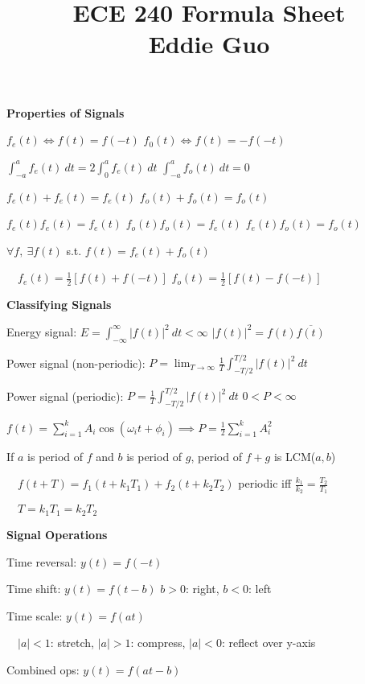 \documentclass[twocolumn]{article}
\title{
	\vspace{-2em}
	\normalsize \textbf{ECE 240 Formula Sheet} \\
	\small Eddie Guo \\
	\dotfill
	\vspace{-5em}
}
\date{}
\begin{document}
\maketitle

\small

\textbf{Properties of Signals}

$f_e(t) \iff f(t) = f(-t)$ \hfill $f_0(t) \iff f(t) = -f(-t)$

$\int_{-a}^a f_e(t)\ dt = 2\int_0^a f_e(t)\ dt$ \hfill $\int_{-a}^a f_o(t)\ dt = 0$

$f_e(t) + f_e(t) = f_e(t)$ \hfill $f_o(t) + f_o(t) = f_o(t)$

$f_e(t) f_e(t) = f_e(t)$ \hfill $f_o(t) f_o(t) = f_e(t)$ \hfill $f_e(t) f_o(t) = f_o(t)$

$\forall f,\ \exists f(t)$ s.t. $f(t) = f_e(t) + f_o(t)$

$\quad f_e(t) = \frac{1}{2} [f(t) + f(-t)]$ \hfill $f_o(t) = \frac{1}{2}[f(t) - f(-t)]$

\dotfill

\textbf{Classifying Signals}

Energy signal: $E = \int_{-\infty}^\infty |f(t)|^2\ dt < \infty$ \hfill $|f(t)|^2 = f(t) \overline{f(t)}$

Power signal (non-periodic):  $P = \lim_{T \to \infty} \frac{1}{T} \int_{-T/2}^{T/2} |f(t)|^2\ dt$

Power signal (periodic): $P = \frac{1}{T} \int_{-T/2}^{T/2} |f(t)|^2\ dt$ \hfill $0 < P < \infty$

$f(t) = \sum_{i=1}^k A_i \cos(\omega_i t + \phi_i) \implies P = \frac{1}{2} \sum_{i=1}^k A_i^2$

If $a$ is period of $f$ and $b$ is period of $g$, period of $f+g$ is LCM($a, b$)

$\quad f(t+T) = f_1(t+k_1 T_1) + f_2(t+k_2 T_2)$ periodic iff $\frac{k_1}{k_2} = \frac{T_2}{T_1}$

$\quad T = k_1 T_1 = k_2 T_2$

\vspace{-.5em}
\dotfill

\textbf{Signal Operations}

Time reversal: $y(t) = f(-t)$

Time shift: $y(t) = f(t-b)$ \hfill $b > 0$: right, $b < 0$: left

Time scale: $y(t) = f(at)$

$\quad |a| < 1$: stretch, $|a| > 1$: compress, $|a| < 0$: reflect over y-axis

Combined ops: $y(t) = f(at-b)$
\end{document}
